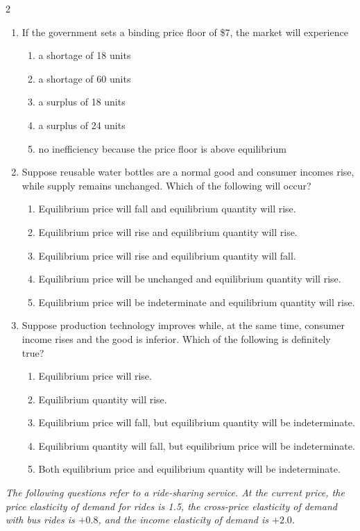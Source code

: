 \documentclass[10pt]{article}
\newenvironment{choiceslist}
  {\begin{enumerate}[label=(\Alph*), leftmargin=1.6em, itemsep=0.12em, topsep=0.18em, parsep=0pt]}
  {\end{enumerate}}
\newenvironment{stimulus}
  {\begin{center}\begin{minipage}{0.96\columnwidth}\footnotesize\itshape\setlength{\tabcolsep}{3pt}\renewcommand{\arraystretch}{0.96}}
  {\end{minipage}\end{center}}
\begin{document}
\begin{multicols*}{2}
\begin{enumerate}[resume*=apq, leftmargin=*, itemsep=0.85em, topsep=0.2em, parsep=0pt]
\begin{choiceslist}
\end{choiceslist}
\item If the government sets a binding price floor of \$7, the market will experience
\begin{choiceslist}
\item a shortage of 18 units
\item a shortage of 60 units
\item a surplus of 18 units
\item a surplus of 24 units
\item no inefficiency because the price floor is above equilibrium
\end{choiceslist}
\item Suppose reusable water bottles are a normal good and consumer incomes rise, while supply remains unchanged. Which of the following will occur?
\begin{choiceslist}
\item Equilibrium price will fall and equilibrium quantity will rise.
\item Equilibrium price will rise and equilibrium quantity will rise.
\item Equilibrium price will rise and equilibrium quantity will fall.
\item Equilibrium price will be unchanged and equilibrium quantity will rise.
\item Equilibrium price will be indeterminate and equilibrium quantity will rise.
\end{choiceslist}
\item Suppose production technology improves while, at the same time, consumer income rises and the good is inferior. Which of the following is definitely true?
\begin{choiceslist}
\item Equilibrium price will rise.
\item Equilibrium quantity will rise.
\item Equilibrium price will fall, but equilibrium quantity will be indeterminate.
\item Equilibrium quantity will fall, but equilibrium price will be indeterminate.
\item Both equilibrium price and equilibrium quantity will be indeterminate.
\end{choiceslist}
\end{enumerate}
\begin{stimulus}
The following questions refer to a ride-sharing service. At the current price, the price elasticity of demand for rides is 1.5, the cross-price elasticity of demand with bus rides is $+0.8$, and the income elasticity of demand is $+2.0$.

\end{stimulus}
\end{multicols*}
\end{document}
